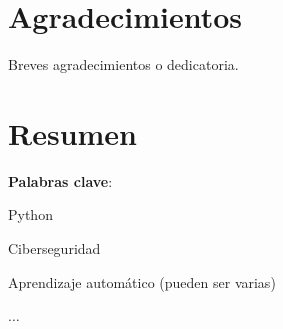 \documentclass[12pt,twoside,titlepage]{report}
\begin{document}
\pagestyle{plain}





\setlength{\parskip}{0.75em}
\renewcommand{\baselinestretch}{1.25}

\setcounter{page}{2}





\chapter*{Agradecimientos}

Breves agradecimientos o dedicatoria.

\afterpage{\blankpage}




\chapter*{Resumen}



\mbox{} \bigskip

\noindent \textbf{Palabras clave}:
\begin{compactitem}
    \item Python
    \item Ciberseguridad
    \item Aprendizaje automático (pueden ser varias)
    \item $\ldots$
\end{compactitem}

\afterpage{\blankpage}

\end{document}
